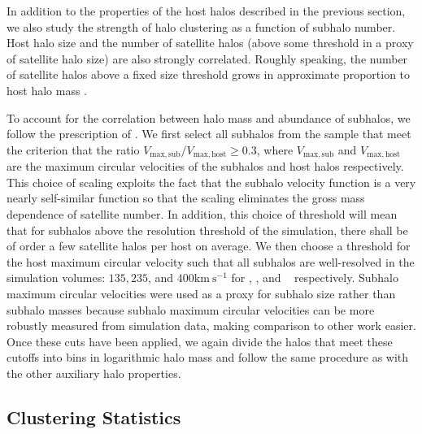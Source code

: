 \documentclass[usenatbib,fleqn]{mnras}
\begin{document}
In addition to the properties of the host halos described in the previous section, we also study the strength of halo clustering as a function of subhalo number. Host halo size and the number of satellite halos (above some threshold in a proxy of satellite halo size) 
are also strongly correlated. Roughly speaking, the number of satellite halos above a fixed size threshold grows in approximate proportion to host halo mass \cite{zentner_etal05}. 

To account for the correlation between halo mass and abundance of subhalos, we follow the prescription of \citet{wechsler_etal06}. We first select all subhalos from the sample
that meet the criterion that the ratio $V_{\mathrm{max,sub}}/V_{\mathrm{max,host}} \ge 0.3$, where
$V_{\mathrm{max,sub}}$ and $V_{\mathrm{max,host}}$ are the maximum circular velocities of the subhalos and host halos respectively.
This choice of scaling exploits the fact that the subhalo velocity function is a very nearly self-similar function \citep{zentner_etal05}
so that the scaling eliminates the gross mass dependence of satellite number.  
In addition, this choice of threshold will mean that for subhalos above the resolution threshold of the simulation, there shall be of order a few satellite halos per host on average. We then choose
a threshold for the host maximum circular velocity such that all subhalos are well-resolved in the simulation volumes: $135, 235$, and $400 \mathrm{km \ s^{-1}}$ for \simA, \simB, and \simC~ respectively. Subhalo maximum circular velocities were used as a proxy for subhalo size rather than subhalo masses because subhalo maximum circular velocities can be more robustly measured from simulation data, making comparison to other work easier. Once these cuts have been applied, we again divide the halos that meet these cutoffs into bins in logarithmic halo mass and follow the same procedure as with the other auxiliary halo properties. 

\subsection{Clustering Statistics}
\label{subsection:clusteringstatistics}
\end{document}

